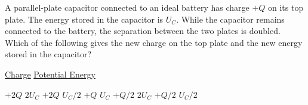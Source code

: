 \begin{questions}\setcounter{question}{25}\question
A parallel-plate capacitor connected to an ideal battery has charge $+Q$ on its top plate. The energy stored in the capacitor is $U_{C}$. While the capacitor remains connected to the battery, the separation between the two plates is doubled.
Which of the following gives the new charge on the top plate and the new energy stored in the capacitor?

\tabto{0.75cm}\underline{Charge}
\tabto{4.00cm}\underline{Potential Energy}

\begin{choices}
\choice $+2 Q$   \tabto{3.25cm} $2 U_{C}$
\choice $+2 Q$   \tabto{3.25cm} $U_{C} / 2$
\choice $+Q$     \tabto{3.25cm} $U_{C}$
\choice $+Q / 2$ \tabto{3.25cm} $2 U_{C}$
\choice $+Q / 2$ \tabto{3.25cm} $U_{C} / 2$
\end{choices}\end{questions}

